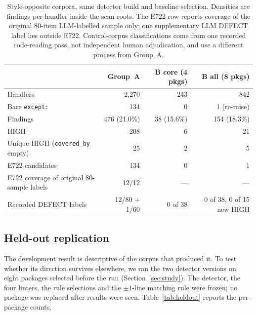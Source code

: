 \documentclass[10pt,a4paper]{article}
\begin{document}
\begin{table}[htbp]
\centering\small
\caption{Style-opposite corpora, same detector build and baseline selection.
Densities are findings per handler inside the scan roots. The E722 row reports
coverage of the original 80-item LLM-labelled sample only; one supplementary
LLM DEFECT label lies outside E722. Control-corpus classifications come
from one recorded code-reading pass, not independent human adjudication,
and use a different process from Group~A.}
\label{tab:control}
\begin{tabular}{@{}lrrr@{}}
\toprule
 & Group~A & B core (4 pkgs) & B all (8 pkgs) \\
\midrule
Handlers & 2{,}270 & 243 & 842 \\
Bare \texttt{except:} & 134 & 0 & 1 (re-raise) \\
Findings & 476 (21.0\%) & 38 (15.6\%) & 154 (18.3\%) \\
HIGH & 208 & 6 & 21 \\
Unique HIGH (\texttt{covered\_by} empty) & 25 & 2 & 5 \\
E722 candidates & 134 & 0 & 1 \\
E722 coverage of original 80-sample labels & 12/12 & --- & --- \\
Recorded DEFECT labels & 12/80 + 1/60 & 0 of 38 & 0 of 38, 0 of 15 new HIGH \\
\bottomrule
\end{tabular}
\end{table}

\subsection{Held-out replication}
\label{sec:heldout}

The development result is descriptive of the corpus that produced it. To test
whether its direction survives elsewhere, we ran the two detector versions on
eight packages selected before the run (Section~\ref{sec:study}). The detector,
the four linters, the rule selections and the $\pm1$-line matching rule were
frozen; no package was replaced after results were seen. Table~\ref{tab:heldout}
reports the per-package counts.
\end{document}
